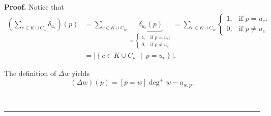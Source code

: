 \documentclass[numbers=enddot,12pt,final,onecolumn,notitlepage]{scrartcl}%
\theoremstyle{definition}
\newenvironment{proof}[1][Proof]{\noindent\textbf{#1.} }{\ \rule{0.5em}{0.5em}}
\let\sumnonlimits\sum
\renewcommand{\sum}{\sumnonlimits\limits}
\begin{document}
\begin{proof}
Notice that%
\begin{align}
\left(  \sum_{c\in K\cup C_{w}}\delta_{u_{c}}\right)  \left(  p\right)   &
=\sum_{c\in K\cup C_{w}}\underbrace{\delta_{u_{c}}\left(  p\right)  }_{=%
\begin{cases}
1, & \text{if }p=u_{c};\\
0, & \text{if }p\neq u_{c}%
\end{cases}
}=\sum_{c\in K\cup C_{w}}%
\begin{cases}
1, & \text{if }p=u_{c};\\
0, & \text{if }p\neq u_{c}%
\end{cases}
\nonumber\\
&  =\left\vert \left\{  c\in K\cup C_{w}\ \mid\ p=u_{c}\right\}  \right\vert
.\label{pf.lem.chip.adj-cycles.capture.ineq.rhs}%
\end{align}


The definition of $\Delta w$ yields
\begin{equation}
\left(  \Delta w\right)  \left(  p\right)  =\left[  p=w\right]  \deg
^{+}w-a_{w,p}.\label{pf.lem.chip.adj-cycles.capture.ineq.Deltawp}%
\end{equation}



\end{proof}
\end{document}
